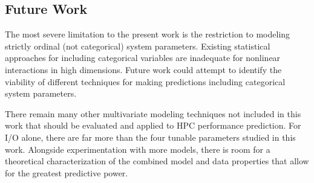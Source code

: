 \documentclass{scspaperproc}
\theoremstyle{scsthe}
\begin{document}
\vspace{-10pt}
\subsection{Future Work}
\vspace{-10pt}
The most severe limitation to the present work is the restriction to
modeling strictly ordinal (not categorical) system
parameters. Existing statistical approaches for including categorical
variables are inadequate for nonlinear interactions in high
dimensions. Future work could attempt to identify the viability of
different techniques for making predictions including categorical
system parameters.

There remain many other multivariate modeling techniques not included
in this work that should be evaluated and applied to HPC performance
prediction. For I/O alone, there are far more than the four tunable
parameters studied in this work. Alongside experimentation with more
models, there is room for a theoretical characterization of the
combined model and data properties that allow for the greatest
predictive power.







\end{document}
